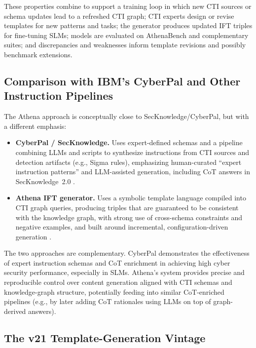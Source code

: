 \documentclass[unnumsec,webpdf,contemporary,large]{oup-authoring-template}
\theoremstyle{thmstyleone}
\theoremstyle{thmstyletwo}
\theoremstyle{thmstylethree}
\begin{document}
These properties combine to support a training loop in which new CTI sources or schema updates lead to a refreshed CTI graph; CTI experts design or revise templates for new patterns and tasks; the generator produces updated IFT triples for fine-tuning SLMs; models are evaluated on AthenaBench and complementary suites; and discrepancies and weaknesses inform template revisions and possibly benchmark extensions.

\subsection{Comparison with IBM's CyberPal and Other Instruction Pipelines}
\label{sec:glaukopis-vs-cyberpal}

The Athena approach is conceptually close to SecKnowledge/CyberPal, but with a different emphasis:

\begin{itemize}
  \item \textbf{CyberPal / SecKnowledge.} Uses expert-defined schemas and a pipeline combining LLMs and scripts to synthesize instructions from CTI sources and detection artifacts (e.g., Sigma rules), emphasizing human-curated ``expert instruction patterns'' and LLM-assisted generation, including CoT answers in SecKnowledge~2.0 \cite{levi2024cyberpal,levi2025toward}.
  \item \textbf{Athena IFT generator.} Uses a symbolic template language compiled into CTI graph queries, producing triples that are guaranteed to be consistent with the knowledge graph, with strong use of cross-schema constraints and negative examples, and built around incremental, configuration-driven generation \cite{cardei2025ift}.
\end{itemize}

The two approaches are complementary. CyberPal demonstrates the effectiveness of expert instruction schemas and CoT enrichment in achieving high cyber security performance, especially in SLMs. Athena's system provides precise and reproducible control over content generation aligned with CTI schemas and knowledge-graph structure, potentially feeding into similar CoT-enriched pipelines (e.g., by later adding CoT rationales using LLMs on top of graph-derived answers).

\subsection{The v21 Template-Generation Vintage}
\label{sec:glaukopis-v21-templates}
\end{document}
